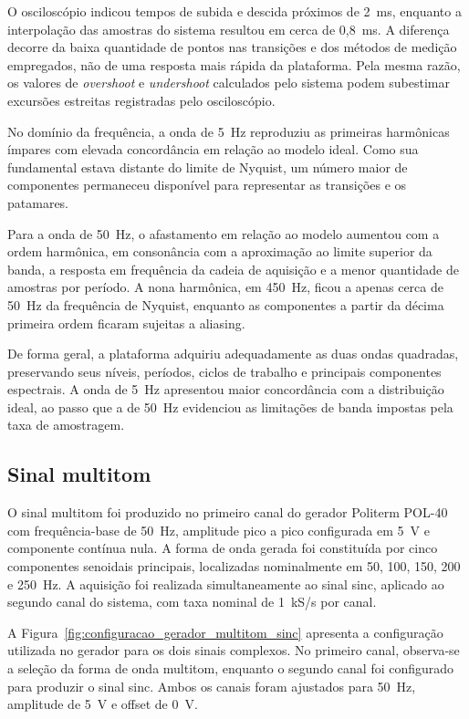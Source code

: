 \documentclass[a4paper,12pt]{fcte}
\begin{document}
O osciloscópio indicou tempos de subida e descida próximos de 2~ms, enquanto a interpolação das amostras do sistema resultou em cerca de 0,8~ms. A diferença decorre da baixa quantidade de pontos nas transições e dos métodos de medição empregados, não de uma resposta mais rápida da plataforma. Pela mesma razão, os valores de \textit{overshoot} e \textit{undershoot} calculados pelo sistema podem subestimar excursões estreitas registradas pelo osciloscópio.

No domínio da frequência, a onda de 5~Hz reproduziu as primeiras harmônicas ímpares com elevada concordância em relação ao modelo ideal. Como sua fundamental estava distante do limite de Nyquist, um número maior de componentes permaneceu disponível para representar as transições e os patamares.

Para a onda de 50~Hz, o afastamento em relação ao modelo aumentou com a ordem harmônica, em consonância com a aproximação ao limite superior da banda, a resposta em frequência da cadeia de aquisição e a menor quantidade de amostras por período. A nona harmônica, em 450~Hz, ficou a apenas cerca de 50~Hz da frequência de Nyquist, enquanto as componentes a partir da décima primeira ordem ficaram sujeitas a aliasing.

De forma geral, a plataforma adquiriu adequadamente as duas ondas quadradas, preservando seus níveis, períodos, ciclos de trabalho e principais componentes espectrais. A onda de 5~Hz apresentou maior concordância com a distribuição ideal, ao passo que a de 50~Hz evidenciou as limitações de banda impostas pela taxa de amostragem.


\subsection{Sinal multitom}
\label{subsec:sinal_multitom}

O sinal multitom foi produzido no primeiro canal do gerador Politerm POL-40 com frequência-base de 50~Hz, amplitude pico a pico configurada em 5~V e componente contínua nula. A forma de onda gerada foi constituída por cinco componentes senoidais principais, localizadas nominalmente em 50, 100, 150, 200 e 250~Hz. A aquisição foi realizada simultaneamente ao sinal sinc, aplicado ao segundo canal do sistema, com taxa nominal de 1~kS/s por canal.

A Figura~\ref{fig:configuracao_gerador_multitom_sinc} apresenta a configuração utilizada no gerador para os dois sinais complexos. No primeiro canal, observa-se a seleção da forma de onda multitom, enquanto o segundo canal foi configurado para produzir o sinal sinc. Ambos os canais foram ajustados para 50~Hz, amplitude de 5~V e offset de 0~V.
\end{document}

